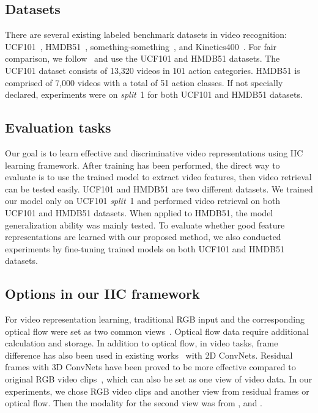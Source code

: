 \documentclass[sigconf]{acmart}
\begin{document}
\subsection{Datasets}
There are several existing labeled benchmark datasets in video recognition: UCF101~\cite{ucf101}, HMDB51~\cite{hmdb}, something-something~\cite{goyal2017something}, and Kinetics400~\cite{kinetics}. For fair comparison, we follow~\cite{xu2019self,tian2019contrastive,luo2020video} and use the UCF101 and HMDB51 datasets. The UCF101 dataset consists of 13,320 videos in 101 action categories. HMDB51 is comprised of 7,000 videos with a total of 51 action classes. If not specially declared, experiments were on \textit{split}~1 for both UCF101 and HMDB51 datasets.

\subsection{Evaluation tasks}
Our goal is to learn effective and discriminative video representations using IIC learning framework. After training has been performed, the direct way to evaluate is to use the trained model to extract video features, then video retrieval can be tested easily. UCF101 and HMDB51 are two different datasets. We trained our model only on UCF101 \textit{split}~1 and performed video retrieval on both UCF101 and HMDB51 datasets. When applied to HMDB51, the model generalization ability was mainly tested. To evaluate whether good feature representations are learned with our proposed method, we also conducted experiments by fine-tuning trained models on both UCF101 and HMDB51 datasets.

\subsection{Options in our IIC framework}
For video representation learning, traditional RGB input and the corresponding optical flow were set as two common views~\cite{sayed2018cross, tian2019contrastive}. Optical flow data require additional calculation and storage. In addition to optical flow, in video tasks, frame difference has also been used in existing works~\cite{wang2016temporal} with 2D ConvNets. Residual frames with 3D ConvNets have been proved to be more effective compared to original RGB video clips~\cite{tao2020rethinking}, which can also be set as one view of video data. In our experiments, we chose RGB video clips and another view from residual frames or optical flow. Then the modality for the second view was from , and .
\end{document}

